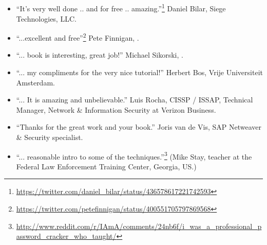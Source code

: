 \subsection*{ \IT{\TITLE}}

\begin{itemize}
\item ``It's very well done .. and for free .. amazing.''\footnote{\url{https://twitter.com/daniel_bilar/status/436578617221742593}} Daniel Bilar, Siege Technologies, LLC.

\item ``...excellent and free''\footnote{\url{https://twitter.com/petefinnigan/status/400551705797869568}} Pete Finnigan, \oracle{}.

\item ``... book is interesting, great job!'' Michael Sikorski,  .

\item ``... my compliments for the very nice tutorial!'' Herbert Bos,  Vrije Universiteit Amsterdam.

\item ``... It is amazing and unbelievable.'' Luis Rocha, CISSP / ISSAP, Technical Manager, Network \& Information Security at Verizon Business.

\item ``Thanks for the great work and your book.'' Joris van de Vis, SAP Netweaver \& Security specialist.

\item ``... reasonable intro to some of the techniques.''\footnote{\url{http://www.reddit.com/r/IAmA/comments/24nb6f/i_was_a_professional_password_cracker_who_taught/}} (Mike Stay, teacher at the Federal Law Enforcement Training Center, Georgia, US.)

\end{itemize}
